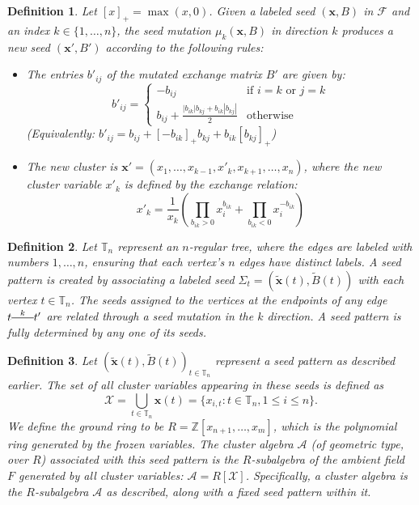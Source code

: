 \documentclass{article}
\newcommand{\Z}{\mathbb{Z}}
\newcommand{\x}{\mathbf{x}}
\newtheorem{definition}{Definition}
\theoremstyle{remark}
\begin{document}
\begin{definition}
Let $[x]_{+} = \max(x, 0)$. Given a labeled seed $(\mathbf{x}, B)$ in $\mathcal{F}$ and an index $k \in \{1, \dots, n\}$, the \emph{seed mutation} $\mu_k(\mathbf{x}, B)$ in direction $k$ produces a new seed $(\mathbf{x}', B')$ according to the following rules:
\begin{itemize}
    \item The entries $b'_{ij}$ of the mutated exchange matrix $B'$ are given by:
    \[
    b'_{ij} = 
    \begin{cases} 
    -b_{ij} & \text{if } i=k \text{ or } j=k \\ 
    b_{ij} + \frac{|b_{ik}|b_{kj} + b_{ik}|b_{kj}|}{2} & \text{otherwise} 
    \end{cases}
    \]
    (Equivalently: $b'_{ij} = b_{ij} + [-b_{ik}]_{+}b_{kj} + b_{ik}[b_{kj}]_{+}$)
    
    \item The new cluster is $\mathbf{x}' = (x_1, \dots, x_{k-1}, x'_k, x_{k+1}, \dots, x_n)$, where the new cluster variable $x'_k$ is defined by the \emph{exchange relation}:
    \[
    x'_k = \frac{1}{x_k} \left( \prod_{b_{ik} > 0} x_i^{b_{ik}} + \prod_{b_{ik} < 0} x_i^{-b_{ik}} \right)
    \]
\end{itemize}
\end{definition}
\begin{definition}
    Let $\mathbb{T}_n$ represent an $n$-regular tree, where the edges are labeled with numbers $1,\ldots,n$, ensuring that each vertex's $n$ edges have distinct labels. A \emph{seed pattern} is created by associating a labeled seed $\Sigma_t = (\tilde{\x}(t), \tilde{B}(t))$ with each vertex $t \in \mathbb{T}_n$. The seeds assigned to the vertices at the endpoints of any edge \( t \overset{k}{\rule[0.5ex]{2em}{0.5pt}} t' \) are related through a seed mutation in the $k$ direction. A seed pattern is fully determined by any one of its seeds.
\end{definition}

\begin{definition}
    Let $(\tilde{\x}(t), \tilde{B}(t))_{t \in \mathbb{T}_n}$ represent a seed pattern as described earlier. The set of all \emph{cluster variables} appearing in these seeds is defined as
    \[\mathcal{X} = \bigcup_{t \in \mathbb{T}_n} \x(t) = \{x_{i,t} : t \in \mathbb{T}_n, 1 \leq i \leq n\}.\]
    We define the \emph{ground ring} to be $R = \Z[x_{n+1}, \ldots, x_m]$, which is the polynomial ring generated by the frozen variables. The \emph{cluster algebra} $\mathcal{A}$ (of geometric type, over $R$) associated with this seed pattern is the $R$-subalgebra of the ambient field $F$ generated by all cluster variables: $\mathcal{A} = R[\mathcal{X}]$. Specifically, a cluster algebra is the $R$-subalgebra $\mathcal{A}$ as described, along with a fixed seed pattern within it.
\end{definition}
\end{document}

